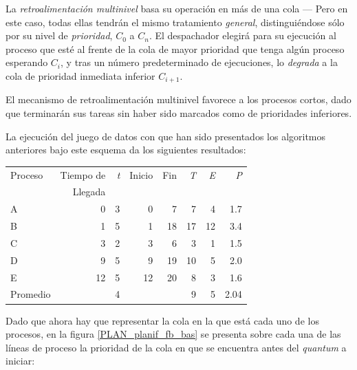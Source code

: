 \documentclass[11pt,fleqn]{book} %
\begin{document}
La \emph{retroalimentación multinivel} basa su operación en más de una cola
— Pero en este caso, todas ellas tendrán el mismo tratamiento
\emph{general}, distinguiéndose sólo por su nivel de \emph{prioridad}, $C_0$ a
$C_n$. El despachador elegirá para su ejecución al proceso que esté al
frente de la cola de mayor prioridad que tenga algún proceso esperando
$C_i$, y tras un número predeterminado de ejecuciones, lo \emph{degrada} a
la cola de prioridad inmediata inferior $C_{i+1}$.

El mecanismo de retroalimentación multinivel favorece a los procesos
cortos, dado que terminarán sus tareas sin haber sido marcados como
de prioridades inferiores.

La ejecución del juego de datos con que han sido presentados los
algoritmos anteriores bajo este esquema da los siguientes resultados:



\begin{center}
\begin{tabular}{lrrrrrrr}
 Proceso   &  Tiempo de  &  \emph{t}  &  Inicio  &  Fin  &  \emph{T}  &  \emph{E}  &  \emph{P}  \\
           &    Llegada  &            &          &       &            &            &            \\
\hline
 A         &          0  &         3  &       0  &    7  &         7  &         4  &       1.7  \\
 B         &          1  &         5  &       1  &   18  &        17  &        12  &       3.4  \\
 C         &          3  &         2  &       3  &    6  &         3  &         1  &       1.5  \\
 D         &          9  &         5  &       9  &   19  &        10  &         5  &       2.0  \\
 E         &         12  &         5  &      12  &   20  &         8  &         3  &       1.6  \\
\hline
 Promedio  &             &         4  &          &       &         9  &         5  &      2.04  \\
\end{tabular}
\end{center}



Dado que ahora hay que representar la cola en la que está cada uno
de los procesos, en la figura \ref{PLAN_planif_fb_bas} se presenta
sobre cada una de las líneas de proceso la prioridad de la cola en que
se encuentra antes del \emph{quantum} a iniciar:
\end{document}
